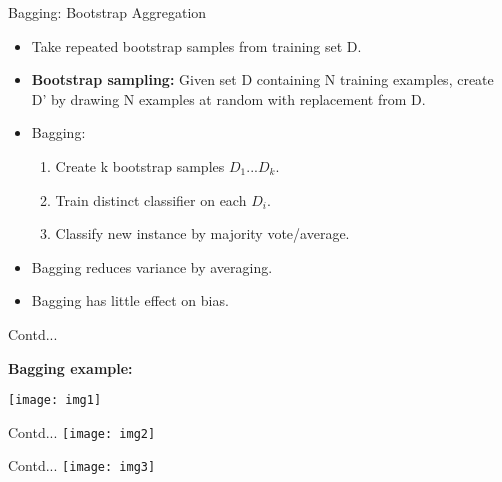 \documentclass{beamer}
\newcommand\myheading[1]{%
  \par\bigskip
  {\large\bfseries#1}\par\smallskip}
\begin{document}
\begin{frame}{Bagging: Bootstrap Aggregation}
\begin{flushleft}
\begin{itemize}
	\item Take repeated bootstrap samples from training set D.
	\item \textbf{Bootstrap sampling:} Given set D containing N training examples, create D' by drawing N examples at random with replacement from D.
	\item Bagging:
	\begin{enumerate}
		\item Create k bootstrap samples $D_1 ... D_k$.
		\item Train distinct classifier on each $D_i$.
		\item Classify new instance by majority vote/average.
	\end{enumerate}
	\item Bagging reduces variance by averaging.
	\item Bagging has little effect on bias.
\end{itemize}
\end{flushleft}
\end{frame}

\begin{frame}{Contd...}
	\myheading{Bagging example:}
	\texttt{[image: img1]}
\end{frame}

\begin{frame}{Contd...}
	\texttt{[image: img2]}
\end{frame}

\begin{frame}{Contd...}
	\texttt{[image: img3]}
\end{frame}
\end{document}
